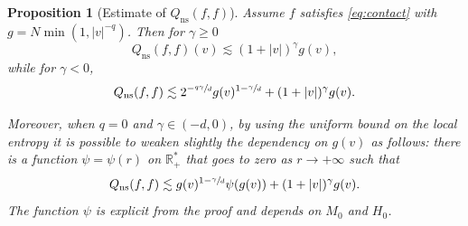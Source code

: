 \documentclass[11pt]{article}
\newcommand{\skpt}{\smallskip}
\newcommand{\ns}{\mathrm{ns}}
\theoremstyle{plain}
\newtheorem{prop}[thm]{Proposition}
\theoremstyle{definition}
\numberwithin{equation}{section}
\newcommand{\R}{\mathbb R}
\let\A N
\begin{document}
\skpt
\begin{prop}[Estimate of $Q_{\ns}(f,f)$] \label{prop:Q2} Assume $f$
satisfies \eqref{eq:contact} with $g = \A \min(1,|v|^{-q})$. Then
for $\gamma \ge 0$
\[ Q_{\ns}(f,f)(v) \lesssim (1+|v|)^{\gamma} g(v), \]
while for $\gamma <0$,
\[
Q_{\ns}(f,f) \lesssim 2^{-\sfrac{q\gamma}{d}} g(v)^{1-\sfrac{\gamma}{d}} +
(1+|v|)^\gamma g(v).
\]

Moreover, when $q=0$ and $\gamma\in (-d,0)$, by using the uniform bound
on the local entropy it is possible to weaken slightly the dependency
on $g(v)$ as follows: there is a function $\psi =\psi(r)$ on $\R_+^*$
that goes to zero as $r \to +\infty$ such that
\begin{equation}
\label{eq:Qnslog}
Q_{\ns}(f,f) \lesssim g(v)^{1-\sfrac{\gamma}{d}} \psi(g(v))
+ (1+|v|)^\gamma g(v).
\end{equation}
The function $\psi$ is explicit from the proof and depends on $M_0$
and $H_0$.
\end{prop}
\end{document}
